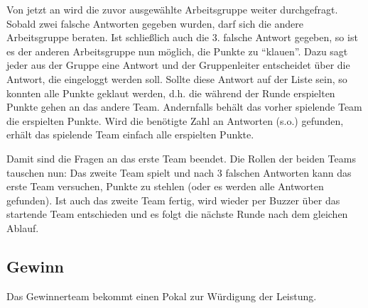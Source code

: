 \documentclass{scrartcl}
\begin{document}
Von jetzt an wird die zuvor ausgewählte Arbeitsgruppe weiter durchgefragt. Sobald zwei falsche Antworten gegeben wurden, darf sich die andere Arbeitsgruppe beraten. Ist schließlich auch die 3. falsche Antwort gegeben, so ist es der anderen Arbeitsgruppe nun möglich, die Punkte zu "`klauen"'. Dazu sagt jeder aus der Gruppe eine Antwort und der Gruppenleiter entscheidet über die Antwort, die eingeloggt werden soll. Sollte diese Antwort auf der Liste sein, so konnten alle Punkte geklaut werden, d.h. die während der Runde erspielten Punkte gehen an das andere Team. Andernfalls behält das vorher spielende Team die erspielten Punkte. Wird die benötigte Zahl an Antworten (s.o.) gefunden, erhält das spielende Team einfach alle erspielten Punkte.

Damit sind die Fragen an das erste Team beendet. Die Rollen der beiden Teams tauschen nun: Das zweite Team spielt und nach 3 falschen Antworten kann das erste Team versuchen, Punkte zu stehlen (oder es werden alle Antworten gefunden). Ist auch das zweite Team fertig, wird wieder per Buzzer über das startende Team entschieden und es folgt die nächste Runde nach dem gleichen Ablauf.

\subsection*{Gewinn}
Das Gewinnerteam bekommt einen Pokal zur Würdigung der Leistung.
\end{document}
